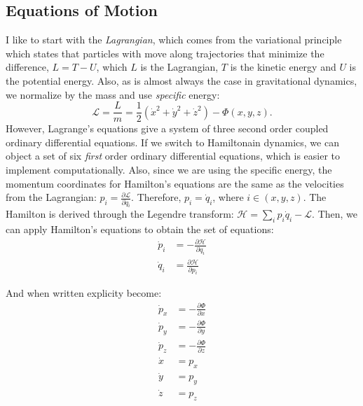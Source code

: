     \subsection{Equations of Motion} \label{subsec:myEquationsOfMotion}
        I like to start with the \textit{Lagrangian}, which comes from the variational principle which states that particles with move along trajectories that minimize the difference, $ L = T-U $, which $L$ is the Lagrangian, $T$ is the kinetic energy and $U$ is the potential energy. Also, as is almost always the case in gravitational dynamics, we normalize by the mass and use \textit{specific} energy: 
        \begin{equation}
            \mathcal{L} = \frac{L}{m} = \frac{1}{2}\left(\dot{x}^2+\dot{y}^2+\dot{z}^2\right) - \Phi(x,y,z).
        \end{equation}
        However, Lagrange's equations give a system of three second order coupled ordinary differential equations. If we switch to Hamiltonain dynamics, we can object a set of six \textit{first} order ordinary differential equations, which is easier to implement computationally. Also, since we are using the specific energy, the momentum coordinates for Hamilton's equations are the same as the velocities from the Lagrangian: $ p_i = \frac{\partial \mathcal{L}}{\partial \dot{q}_i}$. Therefore, $p_i = \dot{q}_i$, where $i \in \left(x,y,z\right)$. The Hamilton is derived through the Legendre transform: $ \mathcal{H}=\sum_i p_i\dot{q}_i - \mathcal{L}$. Then, we can apply Hamilton's equations to obtain the set of equations: 
        \begin{align}
            \dot{p}_i &= -\frac{\partial \mathcal{H}}{\partial q_i} \\
            \dot{q}_i &= \frac{\partial \mathcal{H}}{\partial p_i}
        \end{align}

        And when written explicity become: 
        \begin{align}
            \dot{p}_x &= -\frac{\partial \Phi}{\partial x} \\
            \dot{p}_y &= -\frac{\partial \Phi}{\partial y} \\
            \dot{p}_z &= -\frac{\partial \Phi}{\partial z} \\
            \dot{x} &= p_x \\ 
            \dot{y} &= p_y \\ 
            \dot{z} &= p_z \\ 
        \end{align}        




